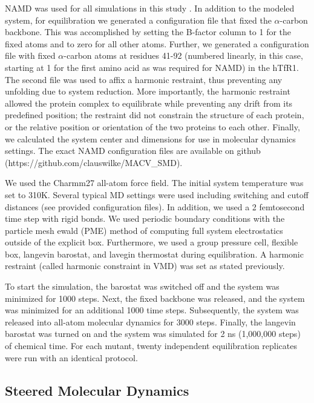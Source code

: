 \documentclass[12pt]{article}
\begin{document}
NAMD was used for all simulations in this study \citep{Phillips2005}. In addition to the modeled system, for equilibration we generated a configuration file that fixed the $\alpha$-carbon backbone. This was accomplished by setting the B-factor column to 1 for the fixed atoms and to zero for all other atoms. Further, we generated a configuration file with fixed $\alpha$-carbon atoms at residues 41-92 (numbered linearly, in this case, starting at 1 for the first amino acid as was required for NAMD) in the hTfR1. The second file was used to affix a harmonic restraint, thus preventing any unfolding due to system reduction. More importantly, the harmonic restraint allowed the protein complex to equilibrate while preventing any drift from its predefined position; the restraint did not constrain the structure of each protein, or the relative position or orientation of the two proteins to each other. Finally, we calculated the system center and dimensions for use in molecular dynamics settings. The exact NAMD configuration files are available on github (https://github.com/clauswilke/MACV\_SMD).

We used the Charmm27 \citep{Brooks1983} all-atom force field. The initial system temperature was set to 310K. Several typical MD settings were used including switching and cutoff distances (see provided configuration files). In addition, we used a 2 femtosecond time step with rigid bonds. We used periodic boundary conditions with the particle mesh ewald (PME) method of computing full system electrostatics outside of the explicit box. Furthermore, we used a group pressure cell, flexible box, langevin barostat, and lavegin thermostat during equilibration. A harmonic restraint (called harmonic constraint in VMD) was set as stated previously. 

To start the simulation, the barostat was switched off and the system was minimized for 1000 steps. Next, the fixed backbone was released, and the system was minimized for an additional 1000 time steps. Subsequently, the system was released into all-atom molecular dynamics for 3000 steps. Finally, the langevin barostat was turned on and the system was simulated for 2 ns (1,000,000 steps) of chemical time. For each mutant, twenty independent equilibration replicates were run with an identical protocol.

\subsection{Steered Molecular Dynamics}
\end{document}
